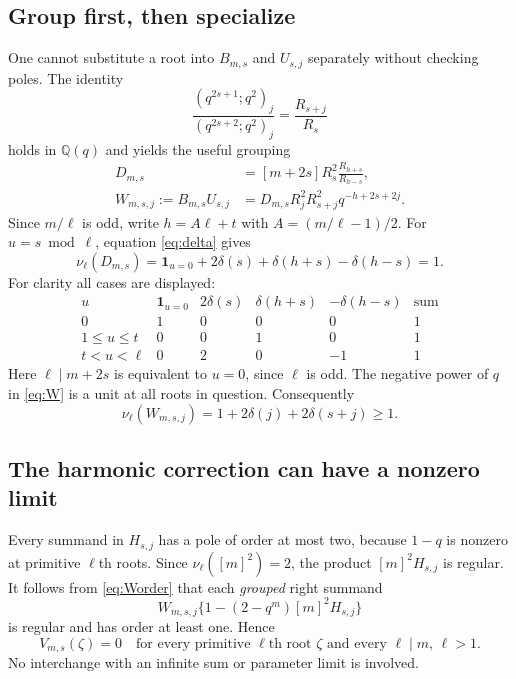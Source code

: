 \documentclass[11pt,a4paper]{article}
\begin{document}
\subsection{Group first, then specialize}
One cannot substitute a root into $B_{m,s}$ and $U_{s,j}$ separately
without checking poles. The identity
\[
 \frac{(q^{2s+1};q^2)_j}{(q^{2s+2};q^2)_j}=\frac{R_{s+j}}{R_s}
\]
holds in $\mathbb Q(q)$ and yields the useful grouping
\begin{align}
 D_{m,s}&=[m+2s]R_s^2\frac{R_{h+s}}{R_{h-s}},\label{eq:D}\\
 W_{m,s,j}:=B_{m,s}U_{s,j}
 &=D_{m,s}R_j^2R_{s+j}^2q^{-h+2s+2j}.\label{eq:W}
\end{align}
Since $m/\ell$ is odd, write $h=A\ell+t$ with
$A=(m/\ell-1)/2$. For $u=s\bmod\ell$, equation \eqref{eq:delta} gives
\[
 \nu_\ell(D_{m,s})=
 \boldsymbol1_{u=0}+2\delta(s)+\delta(h+s)-\delta(h-s)=1.
\]
For clarity all cases are displayed:
\[
\begin{array}{c|rrrr|r}
 u&\boldsymbol1_{u=0}&2\delta(s)&\delta(h+s)&-\delta(h-s)&\text{sum}\\\hline
 0&1&0&0&0&1\\
 1\leq u\leq t&0&0&1&0&1\\
 t<u<\ell&0&2&0&-1&1
\end{array}
\]
Here $\ell\mid m+2s$ is equivalent to $u=0$, since $\ell$ is odd.
The negative power of $q$ in \eqref{eq:W} is a unit at all roots in question.
Consequently
\begin{equation}
 \nu_\ell(W_{m,s,j})=1+2\delta(j)+2\delta(s+j)\geq1.
 \label{eq:Worder}
\end{equation}

\subsection{The harmonic correction can have a nonzero limit}
Every summand in $H_{s,j}$ has a pole of order at most two, because
$1-q$ is nonzero at primitive $\ell$th roots. Since
$\nu_\ell([m]^2)=2$, the product $[m]^2H_{s,j}$ is regular. It follows
from \eqref{eq:Worder} that each \emph{grouped} right summand
\[
 W_{m,s,j}\{1-(2-q^m)[m]^2H_{s,j}\}
\]
is regular and has order at least one. Hence
\begin{equation}
 V_{m,s}(\zeta)=0
 \quad\text{for every primitive $\ell$th root $\zeta$ and every $\ell\mid m$, $\ell>1$}.
 \label{eq:Vzero}
\end{equation}
No interchange with an infinite sum or parameter limit is involved.
\end{document}
